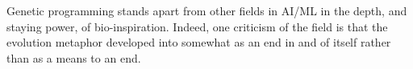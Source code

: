 





Genetic programming stands apart from other fields in AI/ML in the depth, and staying power, of bio-inspiration.
Indeed, one criticism of the field is that the evolution metaphor developed into somewhat as an end in and of itself rather than as a means to an end.

